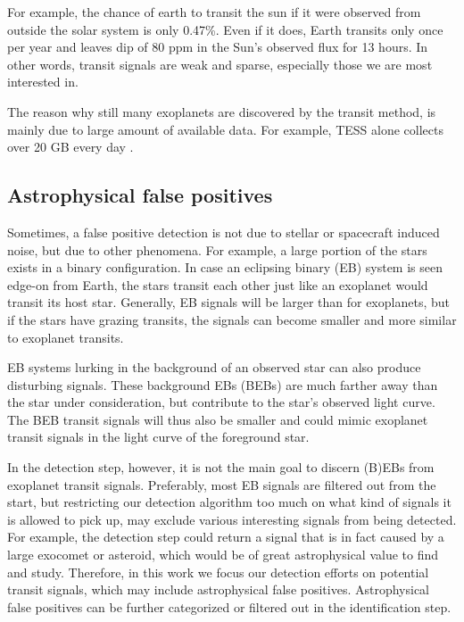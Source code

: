 For example, the chance of earth to transit the sun if it were observed from outside the solar system is only 0.47\%. Even if it does, Earth transits only once per year and leaves dip of 80 ppm in the Sun’s observed flux for 13 hours. In other words, transit signals are weak and sparse, especially those we are most interested in. 

The reason why still many exoplanets are discovered by the transit method, is mainly due to large amount of available data. For example, TESS alone collects over 20 GB every day .

\subsection{Astrophysical false positives}

Sometimes, a false positive detection is not due to stellar or spacecraft induced noise, but due to other phenomena. For example, a large portion of the stars exists in a binary configuration. In case an eclipsing binary (EB) system is seen edge-on from Earth, the stars transit each other just like an exoplanet would transit its host star. Generally, EB signals will be larger than for exoplanets, but if the stars have grazing transits, the signals can become smaller and more similar to exoplanet transits.

EB systems lurking in the background of an observed star can also produce disturbing signals. These background EBs (BEBs) are much farther away than the star under consideration, but contribute to the star's observed light curve. The BEB transit signals will thus also be smaller and could mimic exoplanet transit signals in the light curve of the foreground star.

In the detection step, however, it is not the main goal to discern (B)EBs from exoplanet transit signals. Preferably, most EB signals are filtered out from the start, but restricting our detection algorithm too much on what kind of signals it is allowed to pick up, may exclude various interesting signals from being detected. For example, the detection step could return a signal that is in fact caused by a large exocomet or asteroid, which would be of great astrophysical value to find and study. Therefore, in this work we focus our detection efforts on potential transit signals, which may include astrophysical false positives. Astrophysical false positives can be further categorized or filtered out in the identification step. 